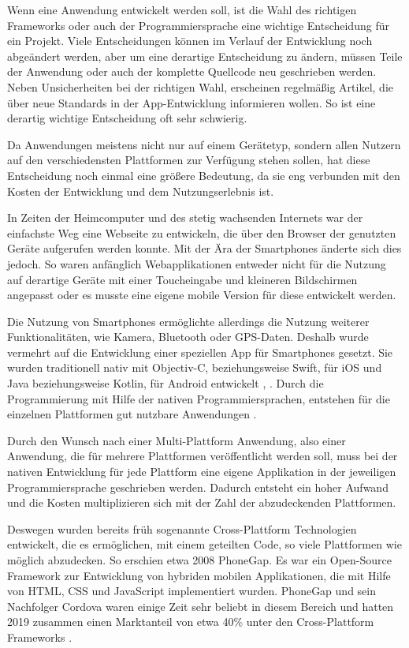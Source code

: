 Wenn eine Anwendung entwickelt werden soll, ist die Wahl des richtigen Frameworks oder auch der Programmiersprache eine wichtige Entscheidung für ein Projekt. Viele Entscheidungen können im Verlauf der Entwicklung noch abgeändert werden, aber um eine derartige Entscheidung zu ändern, müssen Teile der Anwendung oder auch der komplette Quellcode neu geschrieben werden. Neben Unsicherheiten bei der richtigen Wahl, erscheinen regelmäßig Artikel, die über neue Standards in der App-Entwicklung informieren wollen. So ist eine derartig wichtige Entscheidung oft sehr schwierig.

Da Anwendungen meistens nicht nur auf einem Gerätetyp, sondern allen Nutzern auf den verschiedensten Plattformen zur Verfügung stehen sollen, hat diese Entscheidung noch einmal eine größere Bedeutung, da sie eng verbunden mit den Kosten der Entwicklung und dem Nutzungserlebnis ist.

In Zeiten der Heimcomputer und des stetig wachsenden Internets war der einfachste Weg eine Webseite zu entwickeln, die über den Browser der genutzten Geräte aufgerufen werden konnte. Mit der Ära der Smartphones änderte sich dies jedoch. So waren anfänglich Webapplikationen entweder nicht für die Nutzung auf derartige Geräte mit einer Toucheingabe und kleineren Bildschirmen angepasst oder es musste eine eigene mobile Version für diese entwickelt werden\cite{Bryant2012}.

Die Nutzung von Smartphones ermöglichte allerdings die Nutzung weiterer Funktionalitäten, wie Kamera, Bluetooth oder GPS-Daten. Deshalb wurde vermehrt auf die Entwicklung einer speziellen App für Smartphones gesetzt. Sie wurden traditionell nativ mit Objectiv-C, beziehungsweise Swift, für iOS und Java beziehungsweise Kotlin, für Android entwickelt \cite{ELKASSAS2017163}, \cite{researchgate_thomas}. Durch die Programmierung mit Hilfe der nativen Programmiersprachen, entstehen für die einzelnen Plattformen gut nutzbare Anwendungen \cite{researchgate_thomas}.

Durch den Wunsch nach einer Multi-Plattform Anwendung, also einer Anwendung, die für mehrere Plattformen veröffentlicht werden soll, muss bei der nativen Entwicklung für jede Plattform eine eigene Applikation in der jeweiligen Programmiersprache geschrieben werden. Dadurch entsteht ein hoher Aufwand und die Kosten multiplizieren sich mit der Zahl der abzudeckenden Plattformen.

Deswegen wurden bereits früh sogenannte Cross-Plattform Technologien entwickelt, die es ermöglichen, mit einem geteilten Code, so viele Plattformen wie möglich abzudecken. So erschien etwa 2008 PhoneGap. Es war ein Open-Source Framework zur Entwicklung von hybriden mobilen Applikationen, die mit Hilfe von HTML, CSS und JavaScript implementiert wurden. PhoneGap und sein Nachfolger Cordova waren einige Zeit sehr beliebt in diesem Bereich und hatten 2019 zusammen einen Marktanteil von etwa 40\% unter den Cross-Plattform Frameworks \cite{statist_CP_Framework}.

